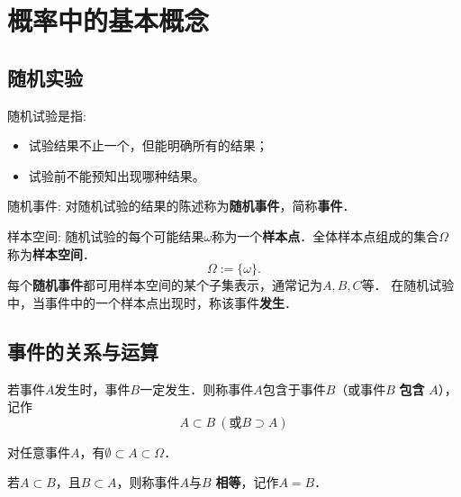 
\usepackage{ctex}



% 

\section{概率中的基本概念}

\subsection{随机实验}

\begin{definition}
    随机试验是指: 
    \begin{itemize}
        \item 试验结果不止一个，但能明确所有的结果；
        \item 试验前不能预知出现哪种结果。
    \end{itemize}
\end{definition}

\begin{definition}
    随机事件: 对随机试验的结果的陈述称为\textbf{随机事件}，简称\textbf{事件}．
\end{definition}

\begin{definition}
    样本空间: 随机试验的每个可能结果$\omega$称为一个\textbf{样本点}．全体样本点组成的集合$\Omega$称为\textbf{样本空间}．
    $$
        \Omega:=\{\omega\}.
    $$
    每个\textbf{随机事件}都可用样本空间的某个子集表示，通常记为$A, B, C$等．
    在随机试验中，当事件中的一个样本点出现时，称该事件\textbf{发生}．
\end{definition}

\subsection{事件的关系与运算}

\begin{definition}[事件的关系] 
    若事件$A$发生时，事件$B$一定发生．则称事件$A$包含于事件$B$（或事件$B$ \textbf{包含} $A$），记作
    $$A\subset B \ (\text{或}B\supset A)$$

    对任意事件$A$，有$\emptyset \subset A\subset \Omega$．

    若$A\subset B$，且$B\subset A$，则称事件$A$与$B$ \textbf{相等}，记作$A=B$．
    
\end{definition}

